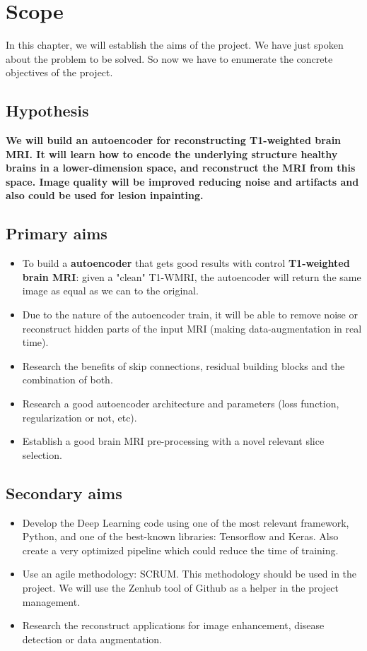 \chapter{Scope}
\label{chapter:scope}

In this chapter, we will establish the aims of the project. We have just spoken about the problem to be solved. So now we have to enumerate the concrete objectives of the project. 

\section{Hypothesis}

\textbf{We will build an autoencoder for reconstructing T1-weighted brain MRI. It will learn how to encode the underlying structure healthy brains in a lower-dimension space, and reconstruct the MRI from this space. Image quality will be improved reducing noise and artifacts and also could be used for lesion inpainting.}

\section{Primary aims}

\begin{itemize}
    \item To build a \textbf{autoencoder} that gets good results with control \textbf{T1-weighted brain MRI}: given a "clean" T1-WMRI, the autoencoder will return the same image as equal as we can to the original.
    \item Due to the nature of the autoencoder train, it will be able to remove noise or reconstruct hidden parts of the input MRI (making data-augmentation in real time).
    \item Research the benefits of skip connections, residual building blocks and the combination of both.
    \item Research a good autoencoder architecture and parameters (loss function, regularization or not, etc).
    \item Establish a good brain MRI pre-processing with a novel relevant slice selection.
\end{itemize}

\section{Secondary aims}

\begin{itemize}
    \item Develop the Deep Learning code using one of the most relevant framework, Python, and one of the best-known libraries: Tensorflow and Keras. Also create a very optimized pipeline which could reduce the time of training.
    \item Use an agile methodology: SCRUM. This methodology should be used in the project. We will use the Zenhub tool of Github as a helper in the project management.
    \item Research the reconstruct applications for image enhancement, disease detection or data augmentation.
\end{itemize}

